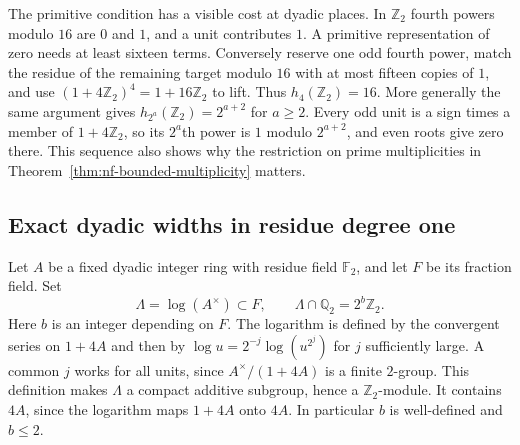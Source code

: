 \documentclass[11pt,letterpaper]{article}
\theoremstyle{definition}
\numberwithin{equation}{section}
\begin{document}
The primitive condition has a visible cost at dyadic places. In
$\mathbb Z_2$ fourth powers modulo $16$ are $0$ and $1$, and a unit
contributes $1$. A primitive representation of zero needs at least
sixteen terms. Conversely reserve one odd fourth power, match the
residue of the remaining target modulo $16$ with at most fifteen
copies of $1$, and use $(1+4\mathbb Z_2)^4=1+16\mathbb Z_2$ to
lift. Thus $h_4(\mathbb Z_2)=16$. More generally the same argument
gives $h_{2^a}(\mathbb Z_2)=2^{a+2}$ for $a\ge2$. Every odd unit
is a sign times a member of $1+4\mathbb Z_2$, so its $2^a$th power
is $1$ modulo $2^{a+2}$, and even roots give zero there. This sequence
also shows why the restriction on prime multiplicities in
Theorem~\ref{thm:nf-bounded-multiplicity} matters.

\subsection{Exact dyadic widths in residue degree one}
\label{sec:nf-exact-dyadic}

Let $A$ be a fixed dyadic integer ring with residue field $\mathbb F_2$,
and let $F$ be its fraction field. Set
\[
        \Lambda=\log(A^\times)\subset F,\qquad
        \Lambda\cap\mathbb Q_2=2^b\mathbb Z_2.
\]
Here $b$ is an integer depending on $F$. The logarithm is defined
by the convergent series on $1+4A$ and then by
$\log u=2^{-j}\log(u^{2^j})$ for $j$ sufficiently large.
A common $j$ works for all units, since
$A^\times/(1+4A)$ is a finite $2$-group. This definition makes
$\Lambda$ a compact additive subgroup, hence a $\mathbb Z_2$-module.
It contains $4A$, since the logarithm maps $1+4A$ onto $4A$.
In particular $b$ is well-defined and $b\le2$.
\end{document}
